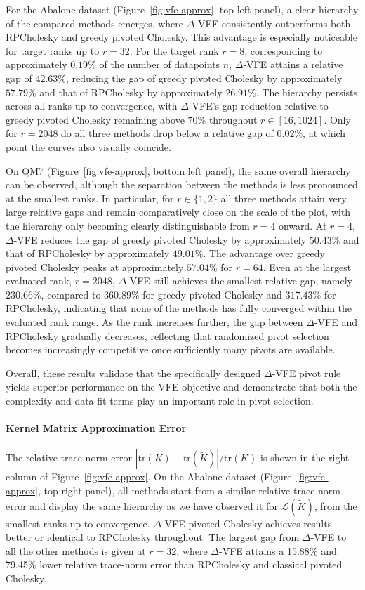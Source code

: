 \documentclass[onefignum,onetabnum]{siamart250211}
\newcommand{\tr}{\mathrm{tr}}
\begin{document}
For the Abalone dataset (Figure~\ref{fig:vfe-approx}, top left panel), a clear hierarchy of the compared methods emerges, where $\Delta$-VFE consistently outperforms both RPCholesky and greedy pivoted Cholesky. This advantage is especially noticeable for target ranks up to $r=32$. For the target rank $r=8$, corresponding to approximately $0.19\%$ of the number of datapoints $n$, $\Delta$-VFE attains a relative gap of $42.63\%$, reducing the gap of greedy pivoted Cholesky by approximately $57.79\%$ and that of RPCholesky by approximately $26.91\%$. 
The hierarchy persists across all ranks up to convergence, with $\Delta$-VFE's gap reduction relative to greedy pivoted Cholesky remaining above $70\%$ throughout $r \in [16, 1024]$. Only for $r=2048$ do all three methods drop below a relative gap of $0.02\%$, at which point the curves also visually coincide.

On QM7 (Figure~\ref{fig:vfe-approx}, bottom left panel), the same overall hierarchy can be observed, although the separation between the methods is less pronounced at the smallest ranks. In particular, for $r \in \{1,2\}$ all three methods attain very large relative gaps and remain comparatively close on the scale of the plot, with the hierarchy only becoming clearly distinguishable from $r=4$ onward. At $r=4$, $\Delta$-VFE reduces the gap of greedy pivoted Cholesky by approximately $50.43\%$ and that of RPCholesky by approximately $49.01\%$. The advantage over greedy pivoted Cholesky peaks at approximately $57.04\%$ for $r=64$. Even at the largest evaluated rank, $r=2048$, $\Delta$-VFE still achieves the smallest relative gap, namely $230.66\%$, compared to $360.89\%$ for greedy pivoted Cholesky and $317.43\%$ for RPCholesky, indicating that none of the methods has fully converged within the evaluated rank range. As the rank increases further, the gap between $\Delta$-VFE and RPCholesky gradually decreases, reflecting that randomized pivot selection becomes increasingly competitive once sufficiently many pivots are available.

Overall, these results validate that the specifically designed $\Delta$-VFE pivot rule yields superior performance on the VFE objective and demonstrate that both the complexity and data-fit terms play an important role in pivot selection.

\paragraph{Kernel Matrix Approximation Error}
The relative trace-norm error $|\tr(K)-\tr(\widetilde{K})|/\tr(K)$ is shown in the right column of Figure~\ref{fig:vfe-approx}. On the Abalone dataset (Figure~\ref{fig:vfe-approx}, top right panel), all methods start from a similar relative trace-norm error and display the same hierarchy as we have observed it for $\mathcal{L}(\widetilde{K})$, from the smallest ranks up to convergence. $\Delta$-VFE pivoted Cholesky achieves results better or identical to RPCholesky throughout. The largest gap from $\Delta$-VFE to all the other methods is given at $r=32$, where $\Delta$-VFE attains a 15.88\% and 79.45\% lower relative trace-norm error than RPCholesky and classical pivoted Cholesky.   
\end{document}
